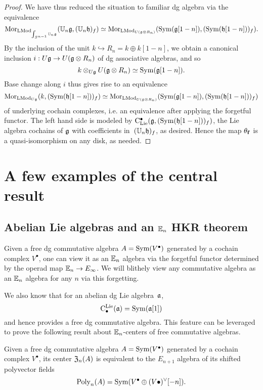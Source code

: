\documentclass[11pt]{amsart}
\numberwithin{equation}{section}
\begin{document}
\begin{proof}
We have thus reduced the situation to familiar dg algebra via the equivalence
\[
{\rm Mor}_{{\rm LMod}_{\int_{S^{n-1}} \mathbb U_n\mathfrak g}}(\mathbb U_n \mathfrak g, (\mathbb U_n \mathfrak h)_f) 
\simeq 
{\rm Mor}_{{\rm LMod}_{U(\mathfrak g \otimes R_n)}} ({\rm Sym}(\mathfrak g[1-n]), ({\rm Sym}(\mathfrak h[1-n]))_f).
\]
By the inclusion of the unit $k \hookrightarrow R_n = k \oplus k[1-n]$,
we obtain a canonical inclusion $i: U\mathfrak g \to U(\mathfrak g \otimes R_n)$ of dg associative algebras,
and so
\[
k \otimes_{U\mathfrak g} U(\mathfrak g \otimes R_n) \simeq {\rm Sym}(\mathfrak g[1-n]).
\]
Base change along $i$ thus gives rise to an equivalence 
\[
{\rm Mor}_{{\rm LMod}_{U\mathfrak g}} (k, ({\rm Sym}(\mathfrak h[1-n]))_f) \simeq {\rm Mor}_{{\rm LMod}_{U(\mathfrak g \otimes R_n)}} ({\rm Sym}(\mathfrak g[1-n]), ({\rm Sym}(\mathfrak h[1-n]))_f)
\]
of underlying cochain complexes, i.e. an equivalence after applying the forgetful functor. 
The left hand side is modeled by ${\rm C}_{\rm Lie}^\bullet(\mathfrak g,({\rm Sym}(\mathfrak h[1-n]))_f)$, 
the Lie algebra cochains of $\mathfrak g$ with coefficients in~$(\mathbb U_n \mathfrak h)_f$, as desired.
Hence the map $\theta_{\bf f}$ is a quasi-isomorphism on any disk, as needed.
\end{proof}

\section{A few examples of the central result}

\subsection{Abelian Lie algebras and an $\mathbb E_n$ HKR theorem}

Given a free dg commutative algebra $A = {\rm Sym}(V^\bullet)$ generated by a cochain complex $V^\bullet$,
one can view it as an $\mathbb E_n$ algebra via the forgetful functor determined by the operad map $\mathbb E_n \to E_\infty$.
We will blithely view any commutative algebra as an $\mathbb E_n$ algebra for any $n$ via this forgetting.

We also know that for an abelian dg Lie algebra~${\frak a}$, 
\[
{\rm C}^{\rm Lie}_\bullet({\frak a}) = {\rm Sym}({\frak a}[1])
\]
and hence provides a free dg commutative algebra.
This feature can be leveraged to prove the following result about $\mathbb E_n$-centers of free commutative algebras.

\begin{prp}
Given a free dg commutative algebra $A = {\rm Sym}(V^\bullet)$ generated by a cochain complex $V^\bullet$,
its center ${\frak Z}_n(A)$ is equivalent to the $E_{n+1}$ algebra of its shifted polyvector fields 
\[
{\rm Poly}_n(A) = {\rm Sym}(V^\bullet \oplus (V\bullet)^\vee[-n]).
\]
\end{prp}
\end{document}
